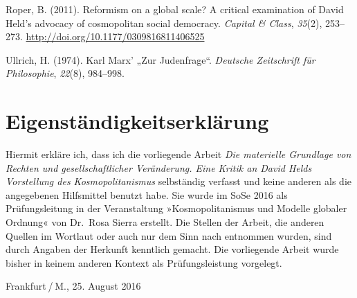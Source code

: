\documentclass[ngerman,12pt, titlepage, smallheadings, nomath]{scrartcl}
\begin{document}
\hypertarget{ref-roper2011}{}
Roper, B. (2011). Reformism on a global scale? A critical examination of
David Held's advocacy of cosmopolitan social democracy. \emph{Capital \&
Class}, \emph{35}(2), 253--273.
\url{http://doi.org/10.1177/0309816811406525}

\hypertarget{ref-ullrich1974}{}
Ullrich, H. (1974). Karl Marx' „Zur Judenfrage``. \emph{Deutsche
Zeitschrift für Philosophie}, \emph{22}(8), 984--998.

\endgroup
\newpage

\section*{Eigenständigkeitserklärung}\label{eigenstuxe4ndigkeitserkluxe4rung}

Hiermit erkläre ich, dass ich die vorliegende Arbeit \emph{Die
materielle Grundlage von Rechten und gesellschaftlicher Veränderung.
Eine Kritik an David Helds Vorstellung des Kosmopolitanismus}
selbständig verfasst und keine anderen als die angegebenen Hilfsmittel
benutzt habe. Sie wurde im SoSe 2016 als Prüfungsleitung in der
Veranstaltung »Kosmopolitanismus und Modelle globaler Ordnung« von
Dr.~Rosa Sierra erstellt. Die Stellen der Arbeit, die anderen Quellen im
Wortlaut oder auch nur dem Sinn nach entnommen wurden, sind durch
Angaben der Herkunft kenntlich gemacht. Die vorliegende Arbeit wurde
bisher in keinem anderen Kontext als Prüfungsleistung vorgelegt.
\vspace{3em}

\noindent Frankfurt / M., 25. August 2016
\end{document}
